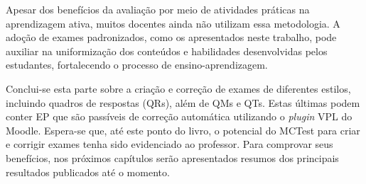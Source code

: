 Apesar dos benefícios da avaliação por meio de atividades práticas na aprendizagem ativa, muitos docentes ainda não utilizam essa metodologia. A adoção de exames padronizados, como os apresentados neste trabalho, pode auxiliar na uniformização dos conteúdos e habilidades desenvolvidas pelos estudantes, fortalecendo o processo de ensino-aprendizagem. 

Conclui-se esta parte sobre a criação e correção de exames de diferentes estilos, incluindo quadros de respostas (QRs), além de QMs e QTs. Estas últimas podem conter EP que são passíveis de correção automática utilizando o \textit{plugin} VPL do Moodle. Espera-se que, até este ponto do livro, o potencial do MCTest para criar e corrigir exames tenha sido evidenciado ao professor. Para comprovar seus benefícios, nos próximos capítulos serão apresentados resumos dos principais resultados publicados até o momento.


